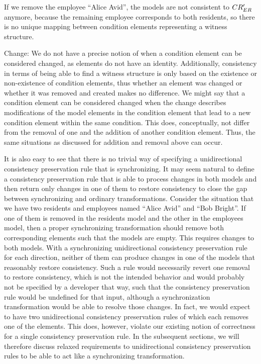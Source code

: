\begin{properdescription}
    If we remove the employee \enquote{Alice Avid}, the models are not consistent to $CR_{ER}'$ anymore, because the remaining employee corresponds to both residents, so there is no unique mapping between condition elements representing a witness structure.
    \item[Change:] We do not have a precise notion of when a condition element can be considered changed, as elements do not have an identity. 
    Additionally, consistency in terms of being able to find a witness structure is only based on the existence or non-existence of condition elements, thus whether an element was changed or whether it was removed and created makes no difference.
    We might say that a condition element can be considered changed when the change describes modifications of the model elements in the condition element that lead to a new condition element within the same condition.
    This does, conceptually, not differ from the removal of one and the addition of another condition element.
    Thus, the same situations as discussed for addition and removal above can occur.
\end{properdescription}

It is also easy to see that there is no trivial way of specifying a unidirectional consistency preservation rule that is synchronizing.
It may seem natural to define a consistency preservation rule that is able to process changes in both models and then return only changes in one of them to restore consistency to close the gap between synchronizing and ordinary transformations.
Consider the situation that we have two residents and employees named \enquote{Alice Avid} and \enquote{Bob Bright}.
If one of them is removed in the residents model and the other in the employees model, then a proper synchronizing transformation should remove both corresponding elements such that the models are empty.
This requires changes to both models.
With a synchronizing unidirectional consistency preservation rule for each direction, neither of them can produce changes in one of the models that reasonably restore consistency.
Such a rule would necessarily revert one removal to restore consistency, which is not the intended behavior and would probably not be specified by a developer that way, such that the consistency preservation rule would be undefined for that input, although a synchronization transformation would be able to resolve those changes.
In fact, we would expect to have two unidirectional consistency preservation rules of which each removes one of the elements.
This does, however, violate our existing notion of correctness for a single consistency preservation rule.
In the subsequent sections, we will therefore discuss relaxed requirements to unidirectional consistency preservation rules to be able to act like a synchronizing transformation.


